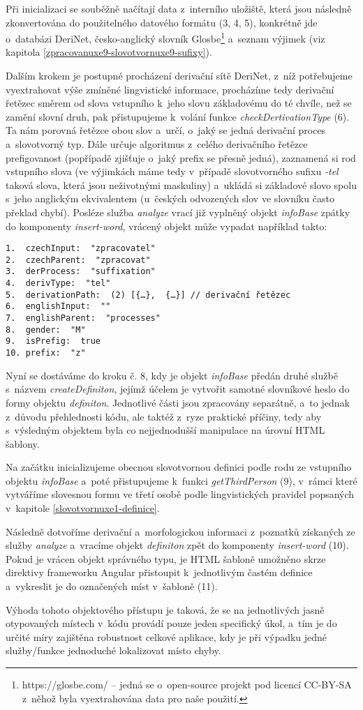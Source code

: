 Při inicializaci se souběžně načítají data z~interního uložiště, která
jsou následně zkonvertována do použitelného datového formátu (3, 4, 5),
konkrétně jde o~databázi DeriNet, česko-anglický slovník
Glosbe\footnote{https://glosbe.com/ -- jedná se o~open-source projekt pod licencí CC-BY-SA z~něhož byla vyextrahována data pro naše použití.}
a~seznam výjimek (viz kapitola
\ref{zpracovanuxe9-slovotvornuxe9-sufixy}).

Dalším krokem je postupné procházení derivační sítě DeriNet, z~níž
potřebujeme vyextrahovat výše zmíněné lingvistické informace, procházíme
tedy derivační řetězec směrem od slova vstupního k~jeho slovu
základovému do té chvíle, než se zamění slovní druh, pak přistupujeme
k~volání funkce \emph{checkDertivationType} (6). Ta nám porovná řetězce
obou slov a~určí, o~jaký se jedná derivační proces a~slovotvorný typ.
Dále určuje algoritmus z~celého derivačního řetězce prefigovanost
(popřípadě zjišťuje o~jaký prefix se přesně jedná), zaznamená si rod
vstupního slova (ve výjimkách máme tedy v~případě slovotvorného sufixu
\emph{-tel} taková slova, která jsou neživotnými maskuliny) a~ukládá si
základové slovo spolu s~jeho anglickým ekvivalentem (u~českých
odvozených slov ve slovníku často překlad chybí). Posléze služba
\emph{analyze} vrací již vyplněný objekt \emph{infoBase} zpátky do
komponenty \emph{insert-word}, vrácený objekt může vypadat například
takto:

\begin{verbatim}
1.  czechInput:  "zpracovatel"
2.  czechParent:  "zpracovat"
3.  derProcess:  "suffixation"
4.  derivType:  "tel"
5.  derivationPath:  (2) [{…},  {…}] // derivační řetězec
6.  englishInput:  ""
7.  englishParent:  "processes"
8.  gender:  "M"
9.  isPrefig:  true
10. prefix:  "z"
\end{verbatim}

Nyní se dostáváme do kroku č. 8, kdy je objekt \emph{infoBase} předán
druhé službě s~názvem \emph{createDefiniton}, jejímž účelem je vytvořit
samotné slovníkové heslo do formy objektu \emph{definiton}. Jednotlivé
části jsou zpracovány separátně, a~to jednak z~důvodu přehlednosti kódu,
ale taktéž z~ryze praktické příčiny, tedy aby s~výsledným objektem byla
co nejjednodušší manipulace na úrovní HTML šablony.

Na začátku inicializujeme obecnou slovotvornou definici podle rodu ze
vstupního objektu \emph{infoBase} a~poté přistupujeme k~funkci
\emph{getThirdPerson} (9), v~rámci které vytváříme slovesnou formu ve
třetí osobě podle lingvistických pravidel popsaných v~kapitole
\ref{slovotvornuxe1-definice}.

Následně dotvoříme derivační a~morfologickou informaci z~poznatků
získaných ze služby \emph{analyze} a~vracíme objekt \emph{definiton}
zpět do komponenty \emph{insert-word} (10). Pokud je vrácen objekt
správného typu, je HTML šabloně umožněno skrze direktivy frameworku
Angular přistoupit k~jednotlivým častém definice a~vykreslit je do
označených míst v~šabloně (11).

Výhoda tohoto objektového přístupu je taková, že se na jednotlivých
jasně otypovaných místech v~kódu provádí pouze jeden specifický úkol,
a~tím je do určité míry zajištěna robustnost celkové aplikace, kdy je při
výpadku jedné služby/funkce jednoduché lokalizovat místo chyby.
